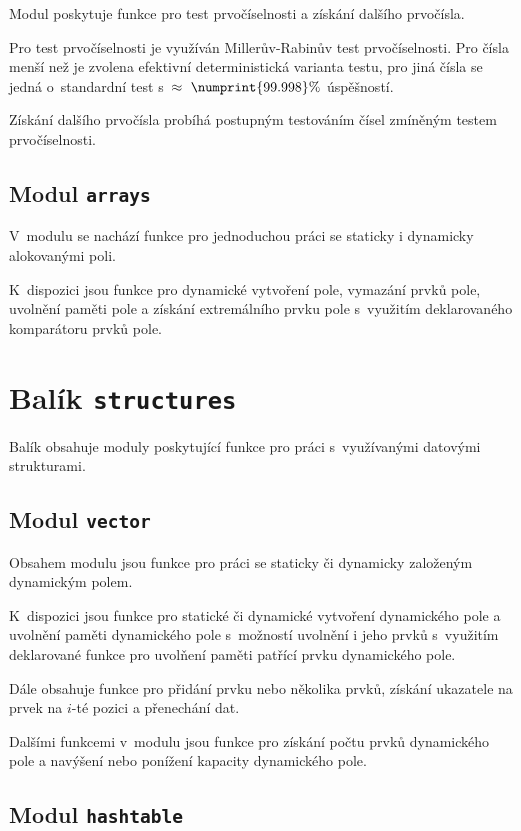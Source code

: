 \documentclass[a4paper, 12pt]{report}
\begin{document}
Modul poskytuje funkce pro test prvočíselnosti a získání dalšího 
prvočísla.

Pro test prvočíselnosti je využíván Millerův-Rabinův test prvočíselnosti. 
Pro čísla menší než  je zvolena efektivní 
deterministická varianta testu, pro jiná čísla se jedná o~standardní test 
s~$\approx~\numprint{99.998}\%$ úspěšností.

Získání dalšího prvočísla probíhá postupným testováním čísel zmíněným 
testem prvočíselnosti.

\subsection{Modul \texttt{arrays}}

V~modulu se nachází funkce pro jednoduchou práci se staticky i dynamicky 
alokovanými poli.

K~dispozici jsou funkce pro dynamické vytvoření pole, vymazání prvků pole, 
uvolnění paměti pole a získání extremálního prvku pole s~využitím 
deklarovaného komparátoru prvků pole.

\section{Balík \texttt{structures}}

Balík obsahuje moduly poskytující funkce pro práci s~využívanými datovými 
strukturami.

\subsection{Modul \texttt{vector}}

Obsahem modulu jsou funkce pro práci se staticky či dynamicky založeným 
dynamickým polem.

K~dispozici jsou funkce pro statické či dynamické vytvoření dynamického 
pole a uvolnění paměti dynamického pole s~možností uvolnění i jeho prvků
s~využitím deklarované funkce pro uvolňení paměti patřící prvku dynamického 
pole.

Dále obsahuje funkce pro přidání prvku nebo několika prvků, získání 
ukazatele na prvek na $i$-té pozici a přenechání dat.

Dalšími funkcemi v~modulu jsou funkce pro získání počtu prvků dynamického 
pole a navýšení nebo ponížení kapacity dynamického pole.

\subsection{Modul \texttt{hashtable}}
\end{document}
